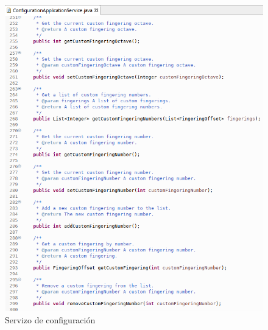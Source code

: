    \begin{figure}[htbp]
    \centering
    \includegraphics[scale=0.6, keepaspectratio=true]{./imagenes/servizo-configuracion-6.png}
    \caption{Servizo de configuración}
    \label{figura:ServizoConfiguracion6}
   \end{figure}
   
